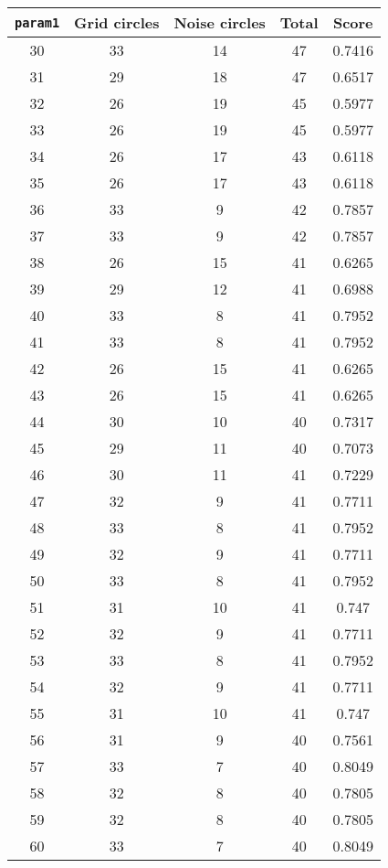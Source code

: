 \documentclass[letterpaper, 12pt]{article}
\begin{document}
\begin{longtable}{|c|c|c|c|c|}
\hline
\textbf{\texttt{param1}} & \textbf{Grid circles} & \textbf{Noise circles} & \textbf{Total} & \textbf{Score} \\
\hline
30 & 33 & 14 & 47 & 0.7416 \\
\hline
31 & 29 & 18 & 47 & 0.6517 \\
\hline
32 & 26 & 19 & 45 & 0.5977 \\
\hline
33 & 26 & 19 & 45 & 0.5977 \\
\hline
34 & 26 & 17 & 43 & 0.6118 \\
\hline
35 & 26 & 17 & 43 & 0.6118 \\
\hline
36 & 33 & 9 & 42 & 0.7857 \\
\hline
37 & 33 & 9 & 42 & 0.7857 \\
\hline
38 & 26 & 15 & 41 & 0.6265 \\
\hline
39 & 29 & 12 & 41 & 0.6988 \\
\hline
40 & 33 & 8 & 41 & 0.7952 \\
\hline
41 & 33 & 8 & 41 & 0.7952 \\
\hline
42 & 26 & 15 & 41 & 0.6265 \\
\hline
43 & 26 & 15 & 41 & 0.6265 \\
\hline
44 & 30 & 10 & 40 & 0.7317 \\
\hline
45 & 29 & 11 & 40 & 0.7073 \\
\hline
46 & 30 & 11 & 41 & 0.7229 \\
\hline
47 & 32 & 9 & 41 & 0.7711 \\
\hline
48 & 33 & 8 & 41 & 0.7952 \\
\hline
49 & 32 & 9 & 41 & 0.7711 \\
\hline
50 & 33 & 8 & 41 & 0.7952 \\
\hline
51 & 31 & 10 & 41 & 0.747 \\
\hline
52 & 32 & 9 & 41 & 0.7711 \\
\hline
53 & 33 & 8 & 41 & 0.7952 \\
\hline
54 & 32 & 9 & 41 & 0.7711 \\
\hline
55 & 31 & 10 & 41 & 0.747 \\
\hline
56 & 31 & 9 & 40 & 0.7561 \\
\hline
57 & 33 & 7 & 40 & 0.8049 \\
\hline
58 & 32 & 8 & 40 & 0.7805 \\
\hline
59 & 32 & 8 & 40 & 0.7805 \\
\hline
60 & 33 & 7 & 40 & 0.8049 \\
\hline

\end{longtable}
\end{document}
